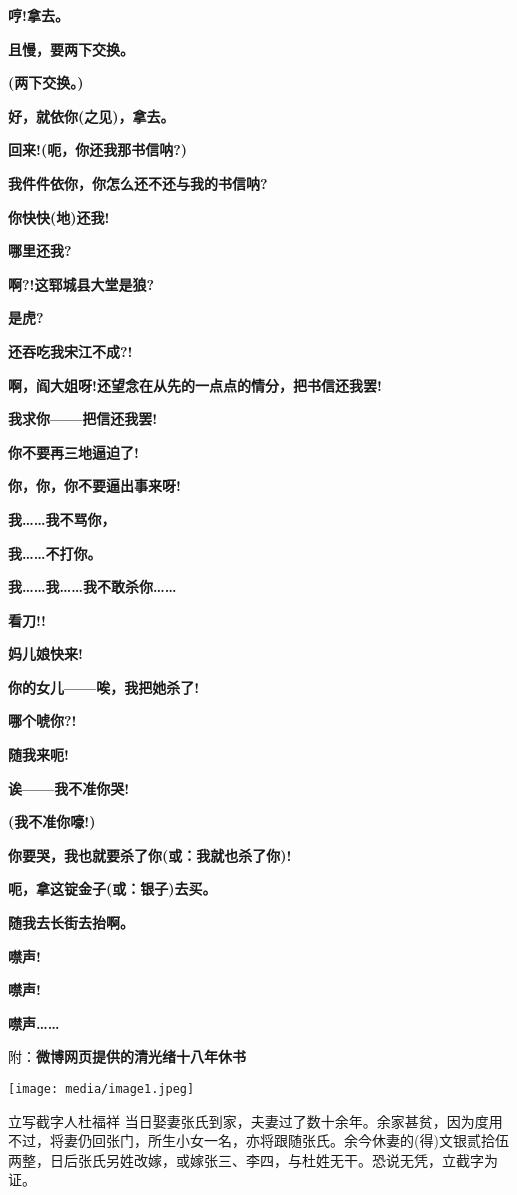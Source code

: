 \textbf{哼!拿去。}

\textbf{且慢，要两下交换。}

\textbf{(两下交换。)}

\textbf{好，就依你(之见)，拿去。}

\textbf{回来!(呃，你还我那书信呐?)}

\textbf{我件件依你，你怎么还不还与我的书信呐?}

\textbf{你快快(地)还我!}

\textbf{哪里还我?}

\textbf{啊?!这郓城县大堂是狼?}

\textbf{是虎?}

\textbf{还吞吃我宋江不成?!}

\textbf{啊，阎大姐呀!还望念在从先的一点点的情分，把书信还我罢!}

\textbf{我求你------把信还我罢!}

\textbf{你不要再三地逼迫了!}

\textbf{你，你，你不要逼出事来呀!}

\textbf{我\ldots{}\ldots{}我不骂你，}

\textbf{我\ldots{}\ldots{}不打你。}

\textbf{我\ldots{}\ldots{}我\ldots{}\ldots{}我不敢杀你\ldots{}\ldots{}}

\textbf{看刀!!}

\textbf{妈儿娘快来!}

\textbf{你的女儿------唉，我把她杀了!}

\textbf{哪个唬你?!}

\textbf{随我来呃!}

\textbf{诶------我不准你哭!}

\textbf{(我不准你嚎!)}

\textbf{你要哭，我也就要杀了你(或：我就也杀了你)!}

\textbf{呃，拿这锭金子(或：银子)去买。}

\textbf{随我去长街去抬啊。}

\textbf{噤声!}

\textbf{噤声!}

\textbf{噤声\ldots{}\ldots{}}

附：\textbf{微博网页提供的清光绪十八年休书}

\texttt{[image: media/image1.jpeg]}

立写截字人杜福祥
当日娶妻张氏到家，夫妻过了数十余年。余家甚贫，因为度用不过，将妻仍回张门，所生小女一名，亦将跟随张氏。余今休妻的(得)文银贰拾伍两整，日后张氏另姓改嫁，或嫁张三、李四，与杜姓无干。恐说无凭，立截字为证。

